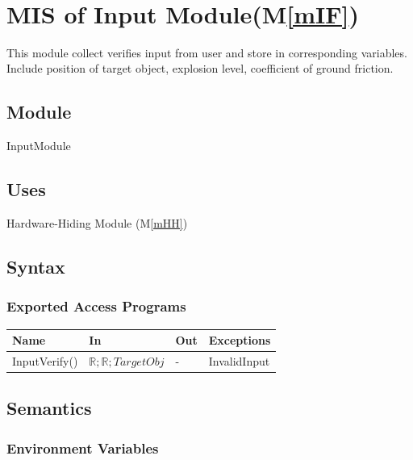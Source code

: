 \documentclass[12pt, titlepage]{article}
\newcommand{\mref}[1]{M\ref{#1}}
\begin{document}
~\newpage

\section{MIS of Input Module(\mref{mIF})} 

This module collect verifies input from user and store in corresponding variables. Include position of target object, explosion level, coefficient of ground friction.

\subsection{Module}

InputModule

\subsection{Uses}

Hardware-Hiding Module (\mref{mHH})
\subsection{Syntax}

\subsubsection{Exported Access Programs}

\begin{center}
\begin{tabular}{p{3cm} p{4cm} p{4cm} p{2cm}}
\hline
\textbf{Name} & \textbf{In} & \textbf{Out} & \textbf{Exceptions} \\
\hline
InputVerify() &  $\mathbb{R}; \mathbb{R}; TargetObj$ & - & InvalidInput\\
\hline
\end{tabular}
\end{center}

\subsection{Semantics}

\subsubsection{Environment Variables}
\end{document}
